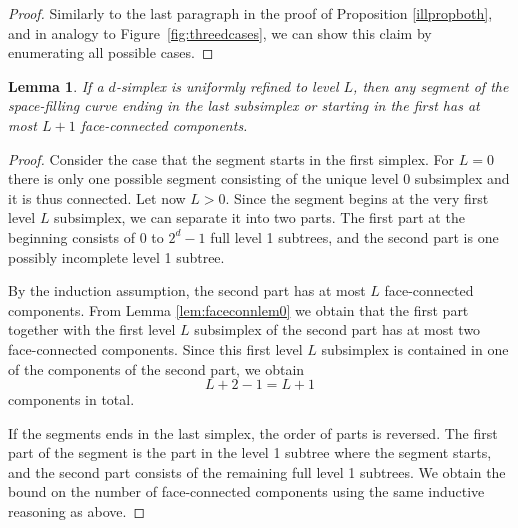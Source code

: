 \documentclass[a4paper,11pt]{article}
\newcommand{\figref}[1]{Figure~\ref{fig:#1}}
\newtheorem{lem}[thm]{Lemma}
\begin{document}
\begin{proof}
  Similarly to the last paragraph in the proof of Proposition \ref{illpropboth},
  and in analogy to \figref{threedcases}, we can show this claim by enumerating
  all possible cases.
\end{proof}
\begin{lem} 
\label{lem:faceconnlem1}
 If a $d$-simplex is uniformly refined to level $L$, then any
 segment of the space-filling curve ending in the last subsimplex or starting in
 the first has at most $L+1$ face-connected components.
\end{lem}
\begin{proof}
  Consider the case that the segment starts in the first simplex.
  For $L=0$ there is only one possible segment consisting of the unique level
  0 subsimplex and it is thus connected.
  Let now $L>0$.
  Since the segment begins at the very first level $L$ subsimplex, we can
  separate it into two parts.
  The first part at the beginning consists of 0 to $2^d-1$ full level 1 subtrees,
  and the second part is one possibly incomplete level 1 subtree.

  By the induction assumption, the second part has at most $L$ face-connected
  components.
  From Lemma \ref{lem:faceconnlem0} we obtain that the first part
  together with the first level $L$ subsimplex of the second part has at most
  two face-connected components.
  Since this first level $L$ subsimplex is contained in one of the components
  of the second part, we obtain
  \begin{equation}
    L + 2 - 1 = L + 1
  \end{equation}
  components in total.

  If the segments ends in the last simplex, the order of parts is reversed.
  The first part of the segment is the part in the level 1 subtree where
  the segment starts, and the second part consists of the remaining full
  level 1 subtrees.
  We obtain the bound on the number of face-connected components using the same
  inductive reasoning as above.
\end{proof}
\end{document}
